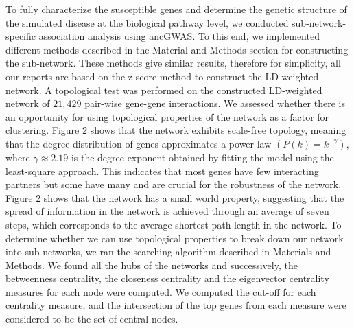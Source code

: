 \documentclass[10pt]{article}
\begin{document}
To fully characterize the susceptible genes and determine the genetic structure of the simulated disease at the biological pathway level, we conducted sub-network-specific association analysis using ancGWAS. To this end, we implemented different methods described in the Material and Methods section for constructing the sub-network. These methods give similar results, therefore for simplicity, all our reports are based on the z-score method to construct the LD-weighted network. A topological test was performed on the constructed LD-weighted network of $21,429$ pair-wise gene-gene interactions. We assessed whether there is an opportunity for using topological properties of the network as a factor for clustering. Figure 2 shows that the network exhibits scale-free topology, meaning that the degree distribution of genes approximates a power law $(P\left(k\right)=k^{-\gamma})$, where $\gamma \approx 2.19$ is the degree exponent obtained by fitting the model using the least-square approach. This indicates that most genes have few interacting partners but some have many and are crucial for the robustness of the network. Figure 2 shows that the network has a small world property, suggesting that the spread of information in the network is achieved through an average of seven steps, which corresponds to the average shortest path length in the network. To determine whether we can use topological properties to break down our network into sub-networks, we ran the searching algorithm described in Materials and Methods. We found all the hubs of the networks and successively, the betweenness centrality, the closeness centrality and the eigenvector centrality measures for each node were computed. We computed the cut-off for each centrality measure, and the intersection of the top genes from each measure were considered to be the set of central nodes. 
\end{document}
